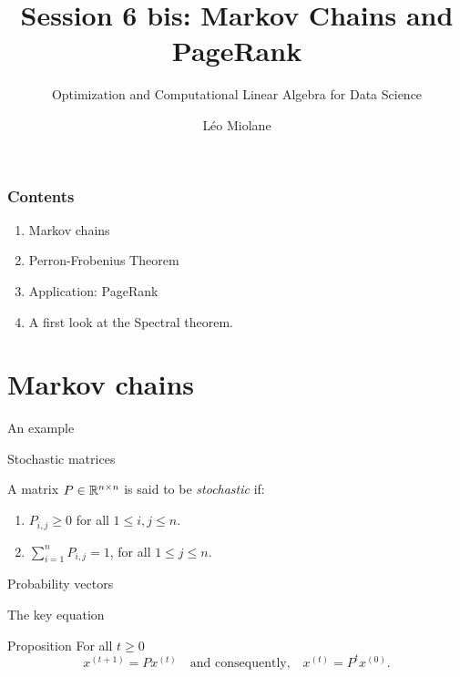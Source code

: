 \documentclass{beamer}
\title{Session 6 bis: Markov Chains and PageRank}
\subtitle{Optimization and Computational Linear Algebra for Data Science}
\author{Léo Miolane}
\date{}
\begin{document}
\setcounter{showProgressBar}{0}
\setcounter{showSlideNumbers}{0}

\frame{\titlepage}

\begin{frame}
	\frametitle{Contents}
	\begin{enumerate}
		\item Markov chains
		\item Perron-Frobenius Theorem
		\item Application: PageRank
		\item A first look at the Spectral theorem.
	\end{enumerate}
\end{frame}


\setcounter{framenumber}{0}
\setcounter{showSlideNumbers}{1}


\section{Markov chains}

\begin{frame}[t]{An example}
	\grid

\end{frame}

\begin{frame}[t]{Stochastic matrices}
	\grid

	\begin{definition}
		A matrix $P \in \mathbb{R}^{n \times n}$ is said to be \emph{stochastic} if:
		\begin{enumerate}
			\item $P_{i,j} \geq 0$ for all $1 \leq i,j \leq n$.
			\item $\sum\limits_{i=1}^n P_{i,j} = 1$, for all $1 \leq j \leq n$.
		\end{enumerate}
	\end{definition}
\end{frame}
\begin{frame}[t]{Probability vectors}
	\grid

\end{frame}

\begin{frame}[t]{The key equation}
	\grid

	\vspace{-0.4cm}
	\begin{block}{Proposition}
		For all $t \geq 0$
		$$
		x^{(t+1)} = P x^{(t)}
		\quad \text{and consequently,} \quad
		x^{(t)} =  P^t x^{(0)}.
		$$
	\end{block}

\end{frame}
\end{document}

